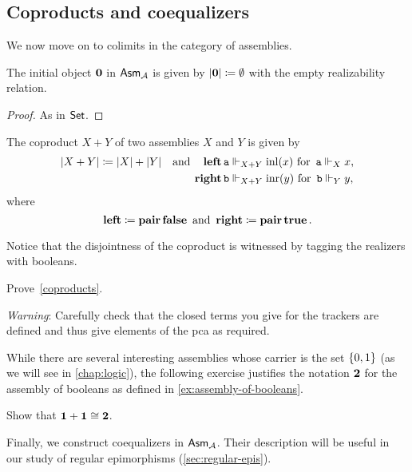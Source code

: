 \subsection{Coproducts and coequalizers}
%
We now move on to colimits in the category of assemblies.

\begin{proposition}
  The initial object \(\mathbf 0\) in \(\mathsf{Asm}_{\mathcal A}\) is given by
  \( \lvert\mathbf 0\rvert \coloneq \emptyset \) with the empty realizability
  relation.
\end{proposition}
\begin{proof}
  As in \(\mathsf{Set}\).
\end{proof}

\begin{proposition}[Coproducts]\label{coproducts}
  The coproduct \(X + Y\) of two assemblies \(X\) and \(Y\) is given by
  \begin{align*}
    \lvert X + Y\rvert \coloneq \lvert X\rvert + \lvert Y\rvert
    \quad\text{and}\quad
    \operatorname{\mathbf{left}}\operatorname{\mathtt{a}} &\Vdash_{X + Y} \operatorname{inl}(x)
      \text{ for } \operatorname{\mathtt{a}} \Vdash_X x,
    \\
    \operatorname{\mathbf{right}}\operatorname{\mathtt{b}} &\Vdash_{X + Y} \operatorname{inr}(y)
    \text{ for }
    \operatorname{\mathtt{b}} \Vdash_Y y,
  \end{align*}
  where
  \[
    \operatorname{\mathbf{left}} \coloneqq \operatorname{\mathbf{pair}}\operatorname{\mathbf{false}}
    \text{ and }
    \operatorname{\mathbf{right}} \coloneqq \operatorname{\mathbf{pair}}\operatorname{\mathbf{true}}.
  \]
\end{proposition}

Notice that the disjointness of the coproduct is witnessed by tagging the
realizers with booleans.

\begin{exercise}\label{exer:coproducts}
  Prove~\cref{coproducts}.

  \emph{Warning}: Carefully check that the closed terms you give for the
  trackers are defined and thus give elements of the pca as required.
\end{exercise}

While there are several interesting assemblies whose carrier is the set
\(\{0,1\}\) (as we will see in \cref{chap:logic}), the following exercise
justifies the notation \(\mathbf 2\) for the assembly of booleans as defined in
\cref{ex:assembly-of-booleans}.

\begin{exercise}\label{exer:coproduct-booleans}
  Show that \({\mathbf 1 + \mathbf 1} \cong \mathbf 2\).
\end{exercise}

Finally, we construct coequalizers in \(\mathsf{Asm}_{\mathcal A}\). Their description will be
useful in our study of regular epimorphisms (\cref{sec:regular-epis}).

